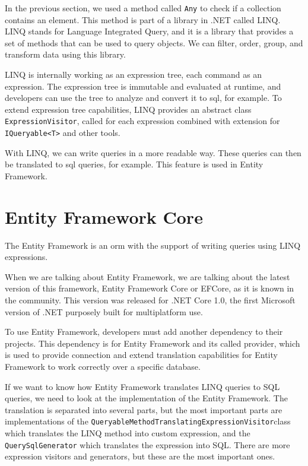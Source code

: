 In the previous section, we used a method called \texttt{Any} to check if a collection contains an element. This method is part of a library in .NET called LINQ.
LINQ stands for Language Integrated Query, and it is a library that provides a set of methods that can be used to query objects.
We can filter, order, group, and transform data using this library.

LINQ is internally working as an expression tree, each command as an expression. The expression tree is immutable and evaluated at runtime, and developers
can use the tree to analyze and convert it to \acrshort{sql}, for example. To extend expression tree capabilities, LINQ provides an abstract class \texttt{ExpressionVisitor},
called for each expression combined with extension for \texttt{IQueryable<T>} and other tools.


With LINQ, we can write queries in a more readable way. These queries can then be translated to \acrshort{sql} queries, for example.
This feature is used in Entity Framework.

\section {Entity Framework Core}

The Entity Framework is an \acrshort{orm} with the support of writing queries using LINQ expressions.

When we are talking about Entity Framework, we are talking about the latest version of this framework, Entity Framework Core or EFCore, as it is known in the community.
This version was released for .NET Core 1.0, the first Microsoft version of .NET purposely built for multiplatform use.

To use Entity Framework, developers must add another dependency to their projects. This dependency is for Entity Framework and its called provider, which is used
to provide connection and extend translation capabilities for Entity Framework to work correctly over a specific database.

If we want to know how Entity Framework translates LINQ queries to SQL queries, we need to look at the implementation of the Entity Framework.
The translation is separated into several parts, but the most important parts are implementations of the \texttt{QueryableMethodTranslatingExpressionVisitor}\linebreak class which translates the LINQ method into custom expression, and the \texttt{QuerySqlGenerator} which translates the expression into SQL.
There are more expression visitors and generators, but these are the most important ones.

